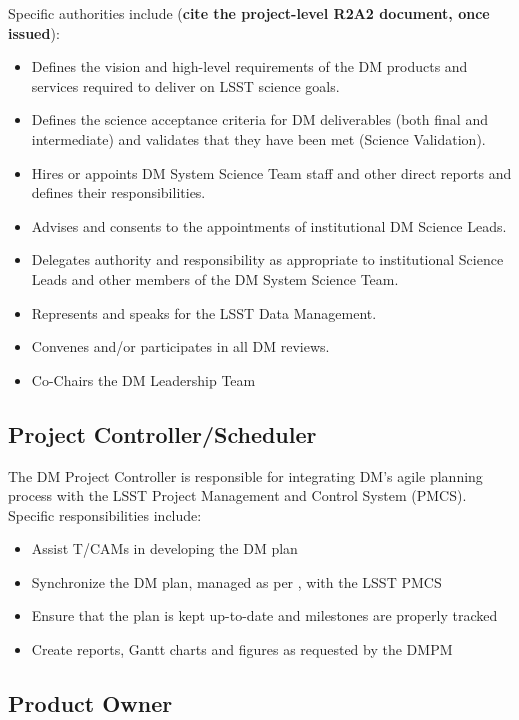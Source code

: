 Specific authorities include (\textbf{cite the project-level R2A2 document, once issued}):

\begin{itemize}
\item Defines the vision and high-level requirements of the DM products and services required to deliver on LSST science goals.
\item Defines the science acceptance criteria for DM deliverables (both final and intermediate) and validates that they have been met (Science Validation).
\item Hires or appoints DM System Science Team staff and other direct reports and defines their responsibilities.
\item Advises and consents to the appointments of institutional DM Science Leads.
\item Delegates authority and responsibility as appropriate to institutional Science Leads and other members of the DM System Science Team.
\item Represents and speaks for the LSST Data Management.
\item Convenes and/or participates in all DM reviews.
\item Co-Chairs the DM Leadership Team
\end{itemize}

\subsection{Project Controller/Scheduler \label{role:pcon}}

The DM Project Controller is responsible for integrating DM's agile planning process with the LSST Project Management and Control System (PMCS). Specific responsibilities include:

\begin{itemize}

  \item{Assist T/CAMs in developing the DM plan}
  \item{Synchronize the DM plan, managed as per , with the LSST PMCS}
  \item{Ensure that the plan is kept up-to-date and milestones are properly tracked}
  \item{Create reports, Gantt charts and figures as requested by the DMPM}

\end{itemize}

\subsection{Product Owner \label{role:prodo}}

